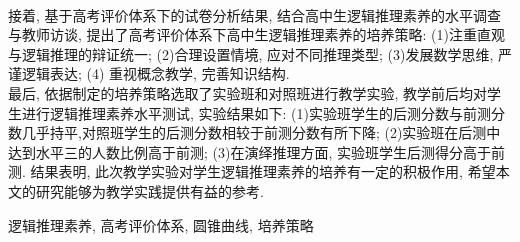 \begin{cabstract}
\\
\indent
接着, 基于高考评价体系下的试卷分析结果, 结合高中生逻辑推理素养的水平调查与教师访谈, 提出了高考评价体系下高中生逻辑推理素养的培养策略: (1)注重直观与逻辑推理的辩证统一; (2)合理设置情境, 应对不同推理类型; (3)发展数学思维, 严谨逻辑表达; (4) 重视概念教学, 完善知识结构.
\\
\indent
最后, 依据制定的培养策略选取了实验班和对照班进行教学实验, 教学前后均对学生进行逻辑推理素养水平测试, 实验结果如下: (1)实验班学生的后测分数与前测分数几乎持平,对照班学生的后测分数相较于前测分数有所下降; (2)实验班在后测中达到水平三的人数比例高于前测; (3)在演绎推理方面, 实验班学生后测得分高于前测. 结果表明, 此次教学实验对学生逻辑推理素养的培养有一定的积极作用, 希望本文的研究能够为教学实践提供有益的参考. 
\end{cabstract}


\begin{ckeywords}
逻辑推理素养, 高考评价体系, 圆锥曲线, 培养策略
\end{ckeywords}
 
 
